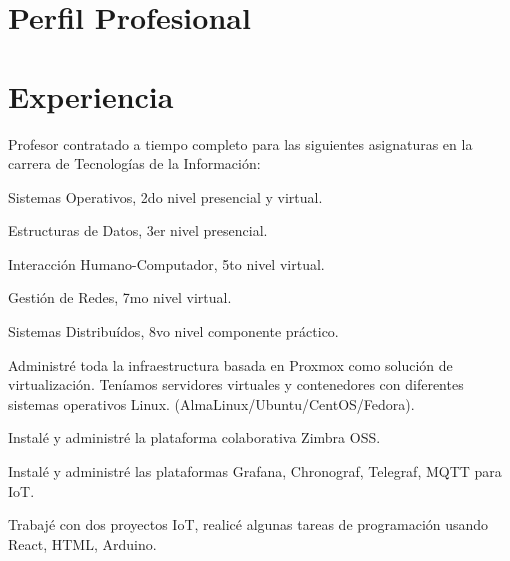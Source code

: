 \documentclass[]{plushcv}
\begin{document}
\begin{minipage}[t]{0.70\textwidth} 


\section{Perfil Profesional}
\runsubsection{}
\sectionsep

\section{Experiencia}
\vspace{\topsep} %
\begin{tightemize}
	\sectionsep
	\item Profesor contratado a tiempo completo para las siguientes asignaturas en la carrera de Tecnologías de la Información:
	\item Sistemas Operativos, 2do nivel presencial y virtual.
	\item Estructuras de Datos, 3er nivel presencial.
	\item Interacción Humano-Computador, 5to nivel virtual.
	\item Gestión de Redes, 7mo nivel virtual.
	\item Sistemas Distribuídos, 8vo nivel componente práctico.
\end{tightemize}
\sectionsep

\begin{tightemize}
\sectionsep
\item Administré toda la infraestructura basada en Proxmox como solución de virtualización. Teníamos servidores virtuales y contenedores con diferentes sistemas operativos Linux. (AlmaLinux/Ubuntu/CentOS/Fedora).
\item Instalé y administré la plataforma colaborativa Zimbra OSS.
\item Instalé y administré las plataformas Grafana, Chronograf, Telegraf, MQTT para IoT.
\item Trabajé con dos proyectos IoT, realicé algunas tareas de programación usando React, HTML, Arduino.
\end{tightemize}
\sectionsep


\end{minipage}
\end{document}
